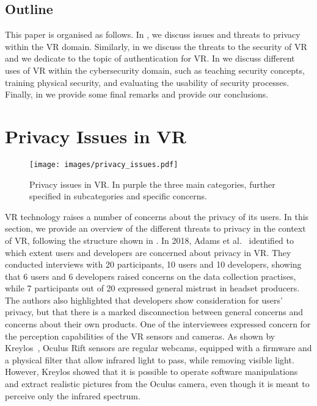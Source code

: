 \documentclass[journal]{IEEEtran}
\begin{document}
\subsection{Outline}
This paper is organised as follows. In , we discuss issues and threats to privacy within the VR domain. Similarly, in  we discuss the threats to the security of VR and we dedicate  to the topic of authentication for VR. In  we discuss different uses of VR within the cybersecurity domain, such as teaching security concepts, training physical security, and evaluating the usability of security processes. Finally, in  we provide some final remarks and provide our conclusions.

\section{Privacy Issues in VR}\label{sec:privacy}
\begin{figure*}[t]
	\center
	\texttt{[image: images/privacy\_issues.pdf]}
	\caption{Privacy issues in VR. In purple the three main categories, further specified in subcategories and specific concerns.}
	\label{fig:privacy}
\end{figure*}

VR technology raises a number of concerns about the privacy of its users. In this section, we provide an overview of the different threats to privacy in the context of VR, following the structure shown in . In 2018, Adams et al.~\cite{adams2018} identified to which extent users and developers are concerned about privacy in VR. They conducted interviews with 20 participants, 10 users and 10 developers, showing that 6 users and 6 developers raised concerns on the data collection practises, while 7 participants out of 20 expressed general mistrust in headset producers. The authors also highlighted that developers show consideration for users' privacy, but that there is a marked disconnection between general concerns and concerns about their own products. One of the interviewees expressed concern for the perception capabilities of the VR sensors and cameras. As shown by Kreylos~\cite{kreylos2017}, Oculus Rift sensors are regular webcams, equipped with a firmware and a physical filter that allow infrared light to pass, while removing visible light. However, Kreylos showed that it is possible to operate software manipulations and extract realistic pictures from the Oculus camera, even though it is meant to perceive only the infrared spectrum.
\end{document}
